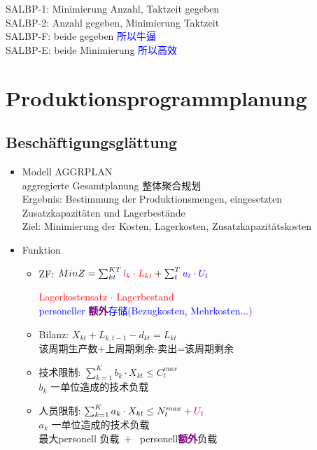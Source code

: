 \documentclass[12pt, letterpaper]{article}
\begin{document}
\begin{CJK*}{UTF8}{gbsn}
\begin{itemize}
SALBP-1: Minimierung Anzahl, Taktzeit gegeben\\[1mm]
SALBP-2: Anzahl gegeben, Minimierung Taktzeit\\[1mm]
SALBP-F: beide gegeben \textcolor{blue}{所以牛逼}\\[1mm]
SALBP-E: beide Minimierung \textcolor{blue}{所以高效}

\end{itemize}


\newpage




\newpage
\section{Produktionsprogrammplanung}
\subsection{Beschäftigungsglättung}

\begin{itemize}
\item Modell AGGRPLAN\\
aggregierte Gesamtplanung 整体聚合规划\\
Ergebnis: Bestimmung der Produktionsmengen, eingesetzten Zusatzkapazitäten und Lagerbestände\\
Ziel: Minimierung der Kosten, Lagerkosten, Zusatzkapazitätskosten 


\item Funktion
\begin{itemize}

\item  ZF: $Min Z =   \sum_{kt}^{KT} 
\textcolor{red}{l_k \cdot L_{kt}} +
\sum_{t}^{T} \textcolor{blue}{u_t \cdot U_t}$ 
   

\textcolor{red}{Lagerkostensatz $\cdot$ Lagerbestand}\\
\textcolor{blue}{personeller \textcolor{purple}{\textbf{额外}}存储(Bezugkosten, Mehrkosten...)}

\item Bilanz: $X_{kt} + L_{k,t-1} - d_{kt} = L_{kt}$\\
该周期生产数+上周期剩余-卖出=该周期剩余

\item 技术限制: $\sum_{k=1}^{K}b_k \cdot X_{kt} \leq C^{max}_t$\\
$b_k$ 一单位造成的技术负载

\item 人员限制: $\sum_{k=1}^{K}a_k \cdot X_{kt} \leq N^{max}_t + \textcolor{purple}{U_t}$\\
$a_k$ 一单位造成的技术负载\\
最大personell 负载\ + \ personell\textcolor{purple}{\textbf{额外}}负载


\end{itemize}
\end{itemize}
\end{CJK*}
\end{document}
